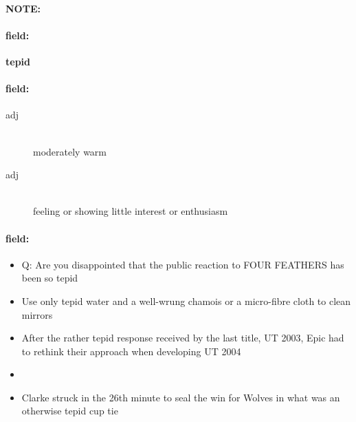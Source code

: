 \documentclass[12pt]{article}
\newenvironment{note}{\paragraph{NOTE:}}{}
\newenvironment{field}{\paragraph{field:}}{}
\begin{document}
\begin{note}
\begin{field}
\textbf{\large tepid}
\end{field}


\begin{field}
\begin{description}
\item[adj] \hfill \\ 
moderately warm

\item[adj] \hfill \\ 
feeling or showing little interest or enthusiasm

\end{description}
\end{field}

\begin{field}
\begin{itemize}
\item Q: Are you disappointed that the public reaction to FOUR FEATHERS has been so tepid
\item Use only tepid water and a well-wrung chamois or a micro-fibre cloth to clean mirrors
\item After the rather tepid response received by the last title, UT 2003, Epic had to rethink their approach when developing UT 2004
\item 
\item Clarke struck in the 26th minute to seal the win for Wolves in what was an otherwise tepid cup tie
\end{itemize}
\end{field}
\end{note}
\end{document}
